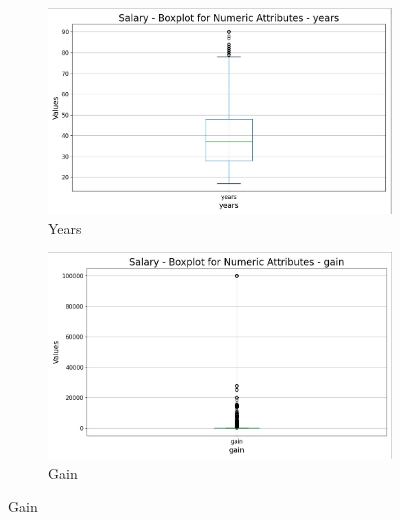 \documentclass[a4paper,12pt]{article}
\begin{document}
\begin{figure}[h!]
    \begin{subfigure}[b]{0.45\textwidth}
        \centering
        \includegraphics[width=\textwidth]{Resources/Boxplot_years.jpeg}
        \caption{Years}
        \label{fig:years}
    \end{subfigure}
    \hfill
    \begin{subfigure}[b]{0.45\textwidth}
        \centering
        \includegraphics[width=\textwidth]{Resources/Boxplot_gain.jpeg}
        \caption{Gain}
        \label{fig:gain}
    \end{subfigure}
    
    \vspace{0.5cm}
    

\end{figure}
\end{document}
